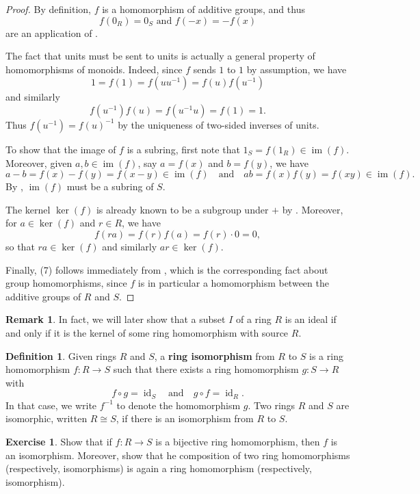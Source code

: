 \documentclass[12pt]{report}
\numberwithin{equation}{section}
\numberwithin{theorem}{chapter}
\theoremstyle{definition}
\newtheorem{definition}[theorem]{Definition}
\newtheorem{exercise}{Exercise}
\newtheorem*{basic properties}{Basic Properties}
\newtheorem*{Important Remark}{Important Remark}
\newtheorem{remark}[theorem]{Remark}
\newcommand{\df}[1]{{\bf #1}\index{#1}}
\renewcommand{\ker}{\operatorname{ker}}
\DeclareMathOperator{\im}{im}
\DeclareMathOperator{\id}{id}
\begin{document}
\begin{proof} 
By definition, $f$ is a homomorphism of additive groups, and thus
$$f(0_R) = 0_S \text{ and } f(-x)=-f(x)$$
are an application of .

The fact that units must be sent to units is actually a general property of homomorphisms of monoids. Indeed, since $f$ sends $1$ to $1$ by assumption, we have 
$$1 = f(1) = f(u u^{-1}) = f(u) f(u^{-1})$$ 
and similarly 
$$f(u^{-1}) f(u) = f(u^{-1}u) = f(1) = 1.$$ 
Thus $f(u^{-1}) = f(u)^{-1}$ by the uniqueness of two-sided inverses of units.

To show that the image of $f$ is a subring, first note that $1_S = f(1_R) \in \im(f)$. Moreover, given $a, b \in \im(f)$, say $a = f(x)$ and $b = f(y)$, we have
$$a-b = f(x) - f(y) = f(x-y) \in \im(f) \quad \text{and} \quad ab = f(x)f(y)=f(xy) \in \im(f).$$
By , $\im(f)$ must be a subring of $S$.

The kernel $\ker(f)$ is already known to be a subgroup under $+$ by . Moreover, for $a \in \ker(f)$ and $r \in R$, we have 
$$f(ra) = f(r) f(a) = f(r) \cdot 0 = 0,$$ 
so that $ra \in \ker(f)$ and similarly $ar \in \ker(f)$. 

Finally, (7) follows immediately from , which is the corresponding fact about group homomorphisms, since $f$ is in particular a homomorphism between the additive groups of $R$ and $S$.
\end{proof}


\begin{remark} 
In fact, we will later show that a subset $I$ of a ring $R$ is an ideal if and only if it is the kernel of some ring homomorphism with source $R$.
\end{remark}



\begin{definition}
 Given rings $R$ and $S$, a \df{ring isomorphism} from $R$ to $S$ is a ring homomorphism $f\!: R \to S$ such that there exists a ring homomorphism $g\!: S \to R$ with 
$$f \circ g = \id_S \quad \text{and} \quad g \circ f = \id_R.$$
In that case, we write $f^{-1}$ to denote the homomorphism $g$.
Two rings $R$ and $S$ are isomorphic, written $R \cong S$, if there is an isomorphism from $R$ to $S$.
\end{definition}


\begin{exercise}
	Show that if $f\!: R \to S$ is a bijective ring homomorphism, then $f$ is an isomorphism. Moreover, show that he composition of two ring homomorphisms (respectively, isomorphisms) is again a ring homomorphism (respectively, isomorphism).
\end{exercise}
\end{document}

